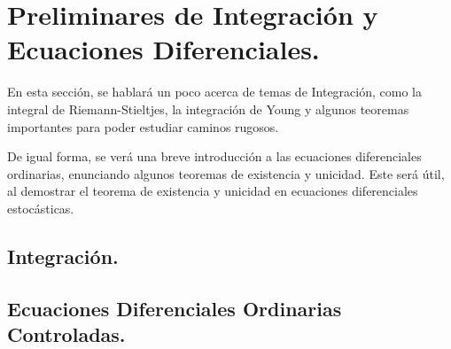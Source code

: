 
















\section{Preliminares de Integración y Ecuaciones Diferenciales.}

En esta sección, se hablará un poco acerca de temas de Integración, como la integral de Riemann-Stieltjes, la integración de Young y algunos teoremas importantes para poder estudiar caminos rugosos.

De igual forma, se verá una breve introducción a las ecuaciones diferenciales ordinarias, enunciando algunos teoremas de existencia y unicidad. Este será útil, al demostrar el teorema de existencia y unicidad en ecuaciones diferenciales estocásticas.







\subsection{Integración.}












\subsection{Ecuaciones Diferenciales Ordinarias Controladas.}

